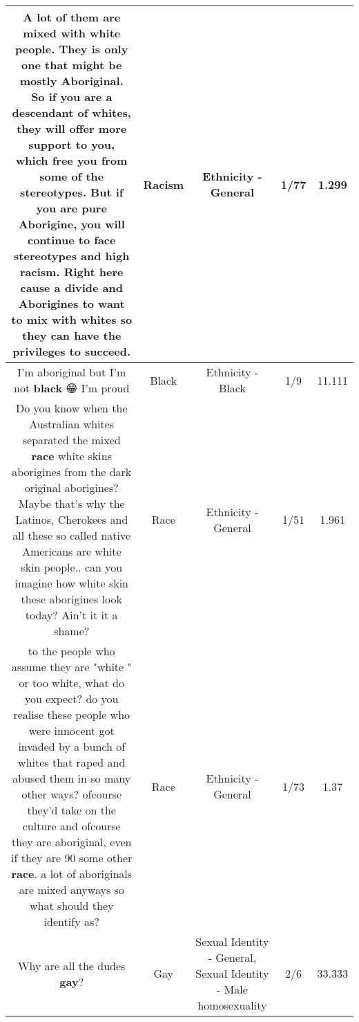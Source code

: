 \documentclass[11pt]{article}
\newlength\mylength
\begin{document}
\begin{center}
\begin{longtable}{|C{.65\mylength}|C{.30\mylength}|C{.12\mylength}|C{.12\mylength}|C{.12\mylength}|}
  \small A lot of them are mixed with white people. They is only one that might be mostly Aboriginal. So if you are a descendant of whites, they will offer more support to you, which free you from some of the stereotypes. But if you are pure Aborigine, you will continue to face stereotypes and high \textbf{racism}. Right here cause a divide and Aborigines to want to mix with whites so they can have the privileges to succeed.\normalsize   & Racism & Ethnicity - General & 1/77 & 1.299 \\  \hline
  \small I'm aboriginal but I'm not \textbf{black}  😁 I'm proud\normalsize   & Black & Ethnicity - Black & 1/9 & 11.111 \\  \hline
  \small Do you know when the Australian whites separated the mixed \textbf{race} white skins aborigines from the dark original aborigines? Maybe that's why the Latinos, Cherokees and all these so called native Americans are white skin people.. can you imagine how white skin these aborigines look today? Ain't it it a shame?\normalsize   & Race & Ethnicity - General & 1/51 & 1.961 \\  \hline
  \small to the people who assume they are "white " or too white, what do you expect? do you realise these people who were  innocent got invaded by a bunch of whites that raped and abused them in so many other ways? ofcourse they'd take on the culture and ofcourse they are aboriginal, even if they are 90 some other \textbf{race}. a lot of aboriginals are mixed anyways so what should they identify as?\normalsize   & Race & Ethnicity - General & 1/73 & 1.37 \\  \hline
  \small Why are all the dudes \textbf{g\textbf{ay}}?\normalsize   & Gay & Sexual Identity - General, Sexual Identity - Male homosexuality & 2/6 & 33.333 \\  \hline

\end{longtable}
\end{center}
\end{document}
